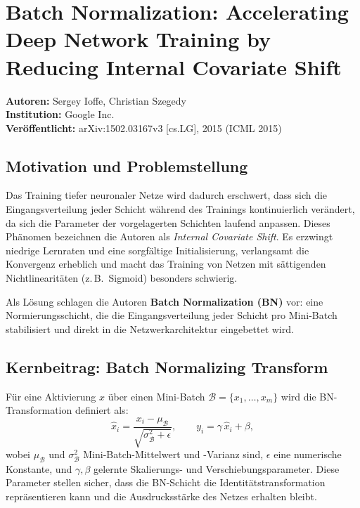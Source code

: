 \documentclass[a4paper,12pt]{article}
\begin{document}
\section*{Batch Normalization: Accelerating Deep Network Training
          by Reducing Internal Covariate Shift}

\noindent\textbf{Autoren:} Sergey Ioffe, Christian Szegedy\\[2pt]
\textbf{Institution:} Google Inc.\\[2pt]
\textbf{Ver\"offentlicht:} arXiv:1502.03167v3 [cs.LG], 2015 (ICML 2015)\\[2pt]

\subsection*{Motivation und Problemstellung}

Das Training tiefer neuronaler Netze wird dadurch erschwert, dass sich die
Eingangsverteilung jeder Schicht w\"ahrend des Trainings kontinuierlich ver\"andert,
da sich die Parameter der vorgelagerten Schichten laufend anpassen. Dieses Ph\"anomen
bezeichnen die Autoren als \emph{Internal Covariate Shift}. Es erzwingt niedrige
Lernraten und eine sorgf\"altige Initialisierung, verlangsamt die Konvergenz
erheblich und macht das Training von Netzen mit s\"attigenden Nichtlinearit\"aten
(z.\,B.\ Sigmoid) besonders schwierig.

Als L\"osung schlagen die Autoren \textbf{Batch Normalization (BN)} vor: eine
Normierungsschicht, die die Eingangsverteilung jeder Schicht pro Mini-Batch
stabilisiert und direkt in die Netzwerkarchitektur eingebettet wird.

\subsection*{Kernbeitrag: Batch Normalizing Transform}

F\"ur eine Aktivierung $x$ \"uber einen Mini-Batch $\mathcal{B} = \{x_1,\ldots,x_m\}$
wird die BN-Transformation definiert als:
\[
  \hat{x}_i = \frac{x_i - \mu_\mathcal{B}}{\sqrt{\sigma^2_\mathcal{B} + \epsilon}},
  \qquad
  y_i = \gamma\,\hat{x}_i + \beta,
\]
wobei $\mu_\mathcal{B}$ und $\sigma^2_\mathcal{B}$ Mini-Batch-Mittelwert und
-Varianz sind, $\epsilon$ eine numerische Konstante, und $\gamma, \beta$ gelernte
Skalierungs- und Verschiebungsparameter. Diese Parameter stellen sicher, dass die
BN-Schicht die Identit\"atstransformation repr\"asentieren kann und die
Ausdrucksst\"arke des Netzes erhalten bleibt.
\end{document}
